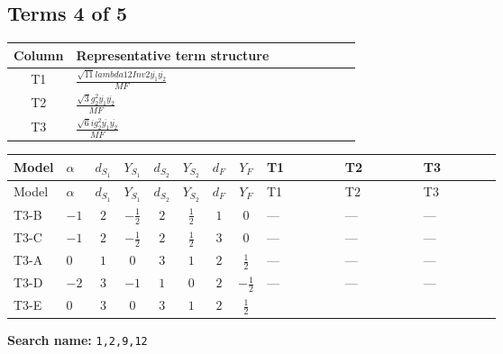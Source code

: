 \documentclass[8pt]{article}
\begin{document}
\begin{landscape}
\subsection*{Terms 4 of 5}
\begin{center}
\begin{tabular}{@{}c >{\raggedright\arraybackslash}p{0.82\linewidth}@{}}
\toprule
Column & Representative term structure \\
\midrule
T1 & \(\displaystyle \frac{\sqrt{11} lambda12Inv2 \overline{y_{1}} \overline{y_{2}}}{MF}\) \\
\midrule
T2 & \(\displaystyle \frac{\sqrt{3} g_{2}^{2} \overline{y_{1}} \overline{y_{2}}}{MF}\) \\
\midrule
T3 & \(\displaystyle \frac{\sqrt{6} i g_{2}^{2} \overline{y_{1}} \overline{y_{2}}}{MF}\) \\
\midrule
\bottomrule
\end{tabular}
\end{center}
\smallskip
\tiny
\begin{longtable}{@{}llcccccc >{\raggedright\arraybackslash}p{0.21\linewidth} >{\raggedright\arraybackslash}p{0.21\linewidth} >{\raggedright\arraybackslash}p{0.21\linewidth}@{}}
\toprule
Model & $\alpha$ & $d_{S_1}$ & $Y_{S_1}$ & $d_{S_2}$ & $Y_{S_2}$ & $d_F$ & $Y_F$ & T1 & T2 & T3 \\
\midrule
\endfirsthead
\toprule
Model & $\alpha$ & $d_{S_1}$ & $Y_{S_1}$ & $d_{S_2}$ & $Y_{S_2}$ & $d_F$ & $Y_F$ & T1 & T2 & T3 \\
\midrule
\endhead
T3-B & $-1$ & $2$ & $-\frac{1}{2}$ & $2$ & $\frac{1}{2}$ & $1$ & $0$ & --- & --- & --- \\
\midrule
T3-C & $-1$ & $2$ & $-\frac{1}{2}$ & $2$ & $\frac{1}{2}$ & $3$ & $0$ & --- & --- & --- \\
\midrule
T3-A & $0$ & $1$ & $0$ & $3$ & $1$ & $2$ & $\frac{1}{2}$ & --- & --- & --- \\
\midrule
T3-D & $-2$ & $3$ & $-1$ & $1$ & $0$ & $2$ & $-\frac{1}{2}$ & --- & --- & --- \\
\midrule
T3-E & $0$ & $3$ & $0$ & $3$ & $1$ & $2$ & $\frac{1}{2}$ & \scriptsize\adjustbox{max width=\linewidth}{$\begin{gathered} \frac{3 \sqrt{11} lambda12Inv2 \overline{y_{1}} \overline{y_{2}}}{22 MF}\end{gathered}$} & \scriptsize\adjustbox{max width=\linewidth}{$\begin{gathered} \frac{15 \sqrt{3} g_{2}^{2} \overline{y_{1}} \overline{y_{2}}}{8 MF}\end{gathered}$} & \scriptsize\adjustbox{max width=\linewidth}{$\begin{gathered} - \frac{\sqrt{6} i g_{2}^{2} \overline{y_{1}} \overline{y_{2}}}{6 MF}\end{gathered}$} \\
\midrule
\bottomrule
\end{longtable}
\clearpage
\noindent\textbf{Search name: }\texttt{1,2,9,12}\par\smallskip

\end{landscape}
\end{document}
